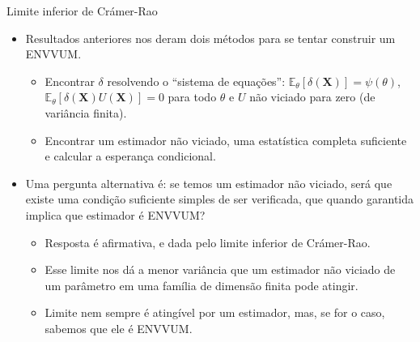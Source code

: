 \documentclass[11pt]{beamer}
\begin{document}
			\begin{frame}{Limite inferior de Crámer-Rao}
		\begin{itemize}
			\item Resultados anteriores nos deram dois métodos para se tentar construir um ENVVUM.
			\begin{itemize}
				\item Encontrar $\delta$ resolvendo o ``sistema de equações'': $\mathbb{E}_\theta[\delta(\boldsymbol{X})]=\psi(\theta)$, $\mathbb{E}_\theta[\delta(\boldsymbol{X}) U(\boldsymbol{X})] = 0$ para todo $\theta$ e $U$ não viciado para zero (de variância finita).
				\item Encontrar um estimador não viciado, uma estatística completa suficiente e calcular a esperança condicional.
			\end{itemize}
			\item Uma pergunta alternativa é: se temos um estimador não viciado, será que existe uma condição {\color{blue}suficiente} simples de ser verificada, que quando garantida implica que estimador é ENVVUM?
			\begin{itemize}
				\item Resposta é afirmativa, e dada pelo limite inferior de Crámer-Rao.
				\item Esse limite nos dá a menor variância que um estimador não viciado de um parâmetro em uma família de dimensão finita pode atingir.
				\item Limite nem sempre é atingível por um estimador, mas, se for o caso, sabemos que ele é ENVVUM.
			\end{itemize}
		\end{itemize}
	\end{frame}
\end{document}
